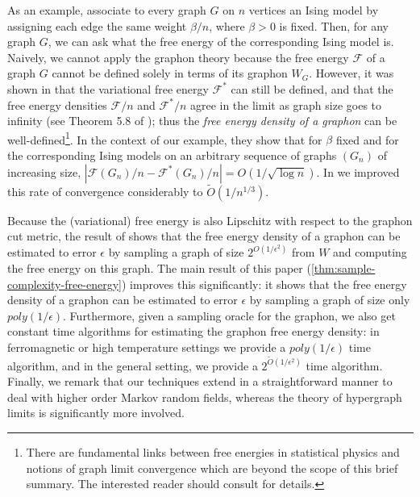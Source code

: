 \documentclass[final, 12pt]{colt2018}
\theoremstyle{definition}
\theoremstyle{plain}
\begin{document}
As an example, associate to every graph $G$ on $n$ vertices an Ising model by assigning each edge the same weight $\beta/n$, where $\beta > 0$ is fixed. Then, for any graph $G$, we can ask what the free energy of the corresponding Ising model is.   Naively, we cannot apply the graphon theory because
the free energy $\mathcal{F}$ of a graph $G$ cannot be defined solely in terms of its graphon $W_G$. However, it was shown in \citep{borgs2012convergent} that the variational free energy $\mathcal{F}^*$ can still be defined, and that the free energy densities
$\mathcal{F}/n$ and $\mathcal{F}^*/n$ agree in the limit as graph size goes to infinity (see Theorem 5.8 of \citep{borgs2012convergent}); thus the \emph{free energy density of a graphon} can be well-defined\footnote{There are fundamental links between free energies in statistical physics and notions of graph limit convergence which are beyond the scope of this brief summary. The interested reader should consult \citep{borgs2012convergent} for details.}. In the
context of our example, they show that for $\beta$ fixed and for the corresponding Ising models on an arbitrary sequence of graphs $(G_n)$ of increasing size, 
$|\mathcal{F}(G_n)/n - \mathcal{F}^*(G_n)/n| = O(1/\sqrt{\log n})$. In \citep{previous-paper} we improved this rate of convergence considerably to $\tilde{O}(1/n^{1/3})$.

Because the (variational) free energy is also Lipschitz with respect to the graphon cut metric, the result of \citep{borgs2012convergent} shows that the free energy density of a graphon can be estimated to error $\epsilon$ by sampling a graph of size $2^{O(1/\epsilon^2)}$ from $W$ and computing the free energy on this graph. The main result of this paper (\cref{thm:sample-complexity-free-energy}) improves this significantly: it shows that the free
energy density of a graphon can be estimated to error $\epsilon$ by sampling a graph of size only $poly(1/\epsilon)$. Furthermore, given a sampling oracle for the graphon, we also get constant time algorithms for estimating the graphon free energy density: in ferromagnetic or high temperature settings we provide a $poly(1/\epsilon)$ time algorithm, and in the general setting, we provide a $2^{\tilde{O}(1/\epsilon^2)}$ time algorithm. Finally, we remark that our techniques extend in a straightforward manner to deal with higher order Markov random fields, whereas the theory of hypergraph limits is significantly more involved. 
\end{document}
